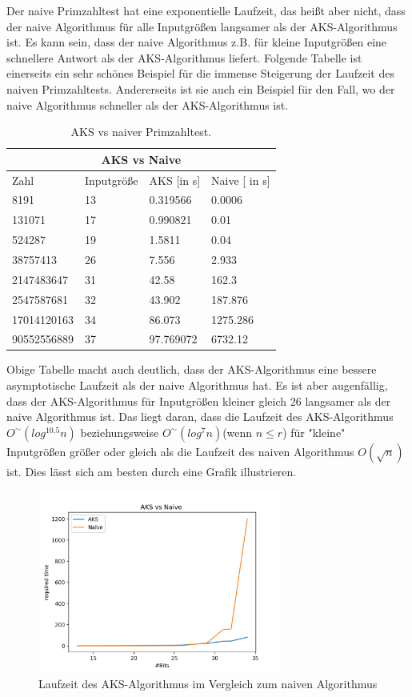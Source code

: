 \documentclass[12pt,oneside]{article}
\theoremstyle{remark}
\theoremstyle{definition}
\begin{document}
Der naive Primzahltest hat eine exponentielle Laufzeit, das heißt aber nicht, dass der naive Algorithmus für alle Inputgrößen langsamer als der AKS-Algorithmus ist. Es kann sein, dass der naive Algorithmus z.B. für kleine Inputgrößen eine schnellere Antwort als der AKS-Algorithmus liefert. Folgende Tabelle ist einerseits ein sehr schönes Beispiel für die immense Steigerung der Laufzeit des naiven Primzahltests. Andererseits ist sie auch ein Beispiel für den Fall, wo der naive Algorithmus schneller als der AKS-Algorithmus ist. 
\begin{table}[h!]
\centering
\begin{tabular}{ |p{3cm}||p{3cm}|p{3cm}|p{3cm}|  }
 \hline
 \multicolumn{4}{|c|}{AKS vs Naive} \\
 \hline
 Zahl & Inputgröße  & AKS [in s] &Naive [ in s]\\
 \hline
 8191   & 13    &0.319566&   0.0006\\
 131071&   17  & 0.990821   &0.01\\
 524287 &19 &  1.5811& 0.04\\
 38757413    &26 & 7.556&   2.933\\
 2147483647& 31  & 42.58   &162.3\\
 2547587681& 32  &  43.902&  187.876\\
 17014120163&   34  & 86.073& 1275.286\\
 90552556889&   37  & 97.769072& 6732.12\\

 \hline
\end{tabular}
 \caption{AKS vs naiver Primzahltest.}
\label{table:4}
\end{table}



Obige Tabelle macht auch deutlich, dass der AKS-Algorithmus eine bessere asymptotische Laufzeit als der naive Algorithmus hat. Es ist aber augenfällig, dass der AKS-Algorithmus für Inputgrößen kleiner gleich 26 langsamer als der naive Algorithmus ist. Das liegt daran, dass die Laufzeit des AKS-Algorithmus $O^{\sim}(log^{10.5}n)$ beziehungsweise $O^{\sim}(log^7n)$(wenn $n \leq r$) für "kleine" $ $ Inputgrößen größer oder gleich als die Laufzeit des naiven Algorithmus $O(\sqrt{n})$ ist. Dies lässt sich am besten durch eine Grafik illustrieren. 


\begin{figure}[h]
\includegraphics[width=8cm]{plots/aksVsNaive.png}
\centering
\caption{Laufzeit des AKS-Algorithmus im Vergleich zum naiven Algorithmus}
\label{plot_aks_naive}
\end{figure}
\end{document}
